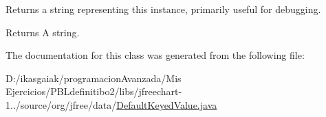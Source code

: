 Returns a string representing this instance, primarily useful for debugging.

\begin{DoxyReturn}{Returns}
A string. 
\end{DoxyReturn}


The documentation for this class was generated from the following file\+:\begin{DoxyCompactItemize}
\item 
D\+:/ikasgaiak/programacion\+Avanzada/\+Mis Ejercicios/\+P\+B\+Ldefinitibo2/libs/jfreechart-\/1../source/org/jfree/data/\mbox{\hyperlink{_default_keyed_value_8java}{Default\+Keyed\+Value.\+java}}\end{DoxyCompactItemize}

